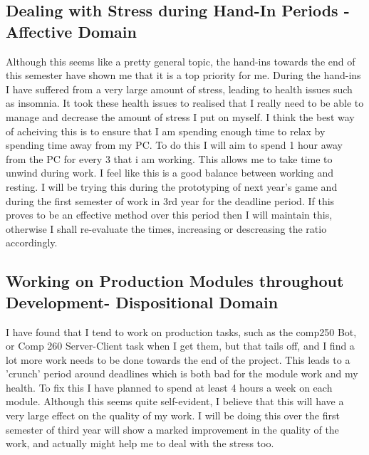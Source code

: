 \documentclass{scrartcl}
\begin{document}
\subsection{Dealing with Stress during Hand-In Periods - Affective Domain}
Although this seems like a pretty general topic, the hand-ins towards the end of this semester have shown me that it is a top priority for me. During the hand-ins I have suffered from a very large amount of stress, leading to health issues such as insomnia. It took these health issues to realised that I really need to be able to manage and decrease the amount of stress I put on myself. I think the best way of acheiving this is to ensure that I am spending enough time to relax by spending time away from my PC. To do this I will aim to spend 1 hour away from the PC for every 3 that i am working. This allows me to take time to unwind during work. I feel like this is a good balance between working and resting. I will be trying this during the prototyping of next year's game and during the first semester of work in 3rd year for the deadline period. If this proves to be an effective method over this period then I will maintain this, otherwise I shall re-evaluate the times, increasing or descreasing the ratio accordingly. 

\subsection{Working on Production Modules throughout Development- Dispositional Domain}
I have found that I tend to work on production tasks, such as the comp250 Bot, or Comp 260 Server-Client task when I get them, but that tails off, and I find a lot more work needs to be done towards the end of the project. This leads to a 'crunch' period around deadlines which is both bad for the module work and my health. To fix this I have planned to spend at least 4 hours a week on each module. Although this seems quite self-evident, I believe that this will have a very large effect on the quality of my work. I will be doing this over the first semester of third year will show a marked improvement in the quality of the work, and actually might help me to deal with the stress too.
\end{document}
